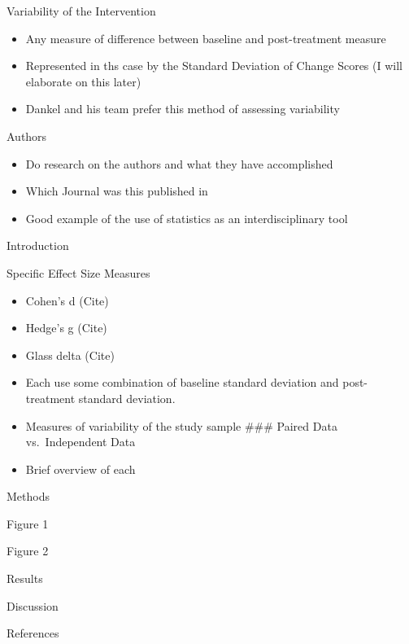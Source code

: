 \documentclass[
  ignorenonframetext,
  aspectratio=169,
]{beamer}
\providecommand{\tightlist}{%
  \setlength{\itemsep}{0pt}\setlength{\parskip}{0pt}}
\begin{document}
\begin{frame}{Variability of the Intervention}
\protect\hypertarget{variability-of-the-intervention}{}
\begin{itemize}
\tightlist
\item
  Any measure of difference between baseline and post-treatment measure
\item
  Represented in ths case by the Standard Deviation of Change Scores (I
  will elaborate on this later)
\item
  Dankel and his team prefer this method of assessing variability
\end{itemize}
\end{frame}

\begin{frame}{Authors}
\protect\hypertarget{authors}{}
\begin{itemize}
\tightlist
\item
  Do research on the authors and what they have accomplished
\item
  Which Journal was this published in
\item
  Good example of the use of statistics as an interdisciplinary tool
\end{itemize}
\end{frame}

\begin{frame}{Introduction}
\protect\hypertarget{introduction}{}
\begin{block}{Specific Effect Size Measures}
\protect\hypertarget{specific-effect-size-measures}{}
\begin{itemize}
\tightlist
\item
  Cohen's d (Cite)
\item
  Hedge's g (Cite)
\item
  Glass delta (Cite)
\item
  Each use some combination of baseline standard deviation and
  post-treatment standard deviation.
\item
  Measures of variability of the study sample \#\#\# Paired Data
  vs.~Independent Data
\item
  Brief overview of each
\end{itemize}
\end{block}
\end{frame}

\begin{frame}{Methods}
\protect\hypertarget{methods}{}
\end{frame}

\begin{frame}{Figure 1}
\protect\hypertarget{figure-1}{}
\end{frame}

\begin{frame}{Figure 2}
\protect\hypertarget{figure-2}{}
\end{frame}

\begin{frame}{Results}
\protect\hypertarget{results}{}
\end{frame}

\begin{frame}{Discussion}
\protect\hypertarget{discussion}{}
\end{frame}

\begin{frame}{References}
\protect\hypertarget{references}{}
\end{frame}
\end{document}
